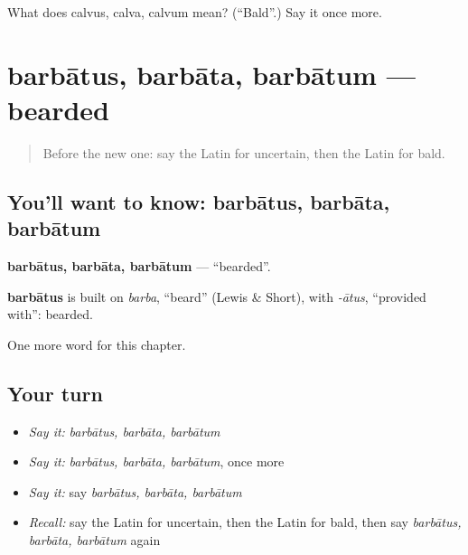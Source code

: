 \begin{tcolorbox}[breakable,colback=teal!4,colframe=teal!35!black,title={Before you move on}]
What does calvus, calva, calvum mean? (\textquotedblleft{}Bald\textquotedblright{}.) Say it once more.
\end{tcolorbox}
\section[barbātus, barbāta, barbātum]{barbātus, barbāta, barbātum — bearded}

\label{lesson:LA-C216-barbatus}



\begin{quote}
Before the new one: say the Latin for uncertain, then the Latin for bald.
\end{quote}

\subsection*{You'll want to know: barbātus, barbāta, barbātum}
\textbf{barbātus, barbāta, barbātum} — \textquotedblleft{}bearded\textquotedblright{}.

\begin{cousinweb}
\textbf{barbātus} is built on \emph{barba}, \textquotedblleft{}beard\textquotedblright{} (Lewis \& Short), with \emph{-ātus}, \textquotedblleft{}provided with\textquotedblright{}: bearded.
\end{cousinweb}

\begin{grammarlens}[title={What you've built}]
One more word for this chapter.
\end{grammarlens}

\subsection*{Your turn}
\begin{itemize}
\raggedright
  \item \emph{Say it:} \emph{barbātus, barbāta, barbātum}
  \item \emph{Say it:} \emph{barbātus, barbāta, barbātum}, once more
  \item \emph{Say it:} say \emph{barbātus, barbāta, barbātum}
  \item \emph{Recall:} say the Latin for uncertain, then the Latin for bald, then say \emph{barbātus, barbāta, barbātum} again
\end{itemize}

